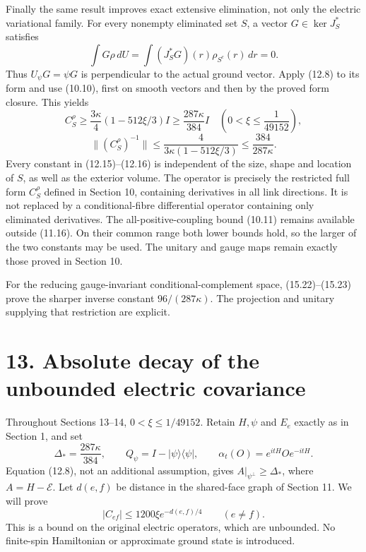 \documentclass[
]{article}
\begin{document}
Finally the same result improves exact extensive elimination, not only
the electric variational family. For every nonempty eliminated set
\(S\), a vector \(G\in\ker J_S^*\) satisfies \[
\int G\rho\,dU=\int (J_S^*G)(r)\rho_{S^c}(r)\,dr=0.
\] Thus \(U_\psi G=\psi G\) is perpendicular to the actual ground
vector. Apply (12.8) to its form and use (10.10), first on smooth
vectors and then by the proved form closure. This yields \[
C_S^\rho\ge\frac{3\kappa}{4}(1-512\xi/3)I
 \ge\frac{287\kappa}{384}I
 \quad\left(0<\xi\le\frac1{49152}\right),                    \tag{12.15}
\] \[
\|(C_S^\rho)^{-1}\|
 \le\frac{4}{3\kappa(1-512\xi/3)}
 \le\frac{384}{287\kappa}.                                  \tag{12.16}
\] Every constant in (12.15)--(12.16) is independent of the size, shape
and location of \(S\), as well as the exterior volume. The operator is
precisely the restricted full form \(C_S^\rho\) defined in Section 10,
containing derivatives in all link directions. It is not replaced by a
conditional-fibre differential operator containing only eliminated
derivatives. The all-positive-coupling bound (10.11) remains available
outside (11.16). On their common range both lower bounds hold, so the
larger of the two constants may be used. The unitary and gauge maps
remain exactly those proved in Section 10.

For the reducing gauge-invariant conditional-complement space,
(15.22)--(15.23) prove the sharper inverse constant \(96/(287\kappa)\).
The projection and unitary supplying that restriction are explicit.

\section{13. Absolute decay of the unbounded electric
covariance}\label{absolute-decay-of-the-unbounded-electric-covariance}

Throughout Sections 13--14, \(0<\xi\le1/49152\). Retain \(H,\psi\) and
\(E_e\) exactly as in Section 1, and set \[
\Delta_*=\frac{287\kappa}{384},\qquad
Q_\psi=I-|\psi\rangle\langle\psi|,\qquad
\alpha_t(O)=e^{itH}Oe^{-itH}.
\] Equation (12.8), not an additional assumption, gives
\(A|_{\psi^\perp}\ge\Delta_*\), where \(A=H-\mathcal E\). Let \(d(e,f)\)
be distance in the shared-face graph of Section 11. We will prove \[
|C_{ef}|\le1200\xi e^{-d(e,f)/4}\qquad(e\ne f).               \tag{13.1}
\] This is a bound on the original electric operators, which are
unbounded. No finite-spin Hamiltonian or approximate ground state is
introduced.
\end{document}
